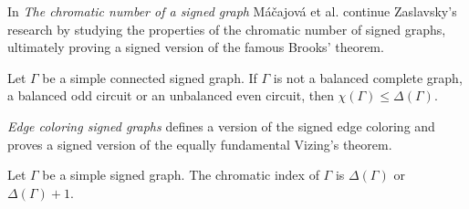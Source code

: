 In \textit{The chromatic number of a signed graph}\cite{chromatic-number} Máčajová et al. continue Zaslavsky's research by studying the properties of the chromatic number of signed graphs, ultimately proving a signed version of the famous Brooks'\cite{brooks} theorem.

\begin{theorem}\label{th:brooks}
    Let $\Gamma$ be a simple connected signed graph. If $\Gamma$ is not a balanced complete graph, a balanced odd circuit or an unbalanced even circuit, then $\chi(\Gamma) \leq \Delta(\Gamma)$.
\end{theorem}

\textit{Edge coloring signed graphs} defines a version of the signed edge coloring and proves a signed version of the equally fundamental Vizing's theorem.

\begin{theorem}\label{th:vizing}
    Let $\Gamma$ be a simple signed graph. The chromatic index of $\Gamma$ is $\Delta(\Gamma)$ or $\Delta(\Gamma) + 1$.
\end{theorem}

\todo{}
